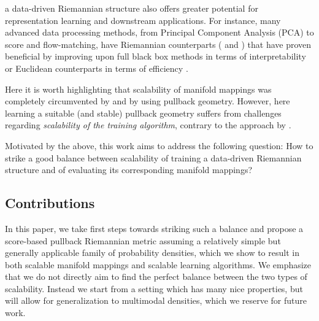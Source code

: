 a data-driven Riemannian structure also offers greater potential for representation learning and downstream applications. For instance, many advanced data processing methods, from Principal Component Analysis (PCA) to score and flow-matching, have Riemannian counterparts (\cite{diepeveen2023curvature,fletcher2004principal} and \cite{chen2023riemannian,huang2022riemannian}) that have proven beneficial by improving upon full black box methods in terms of interpretability \cite{diepeveen2024pulling} or Euclidean counterparts in terms of efficiency \cite{kapusniak2024metricflowmatchingsmooth,de2024pullback}. 

Here it is worth highlighting that scalability of manifold mappings was completely circumvented by \cite{diepeveen2024pulling} and \cite{de2024pullback} by using pullback geometry. 
However, here learning a suitable (and stable) pullback geometry suffers from challenges regarding \emph{scalability of the training algorithm}, contrary to the approach by \cite{sorrenson2024learningdistancesdatanormalizing}.

Motivated by the above, this work aims to address the following question: How to strike a good balance between scalability of training a data-driven Riemannian structure and of evaluating its corresponding manifold mappings?

\subsection{Contributions}
In this paper, we take first steps towards striking such a balance and propose a score-based pullback Riemannian metric assuming a relatively simple but generally applicable family of probability densities, which we show to result in both scalable manifold mappings and scalable learning algorithms. We emphasize that we do not directly aim to find the perfect balance between the two types of scalability. Instead we start from a setting which has many nice properties, but will allow for generalization to multimodal densities, which we reserve for future work.

